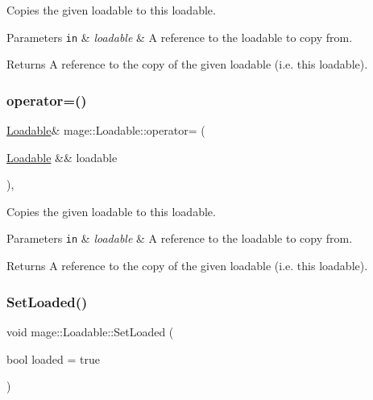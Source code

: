 Copies the given loadable to this loadable.


\begin{DoxyParams}[1]{Parameters}
\mbox{\tt in}  & {\em loadable} & A reference to the loadable to copy from. \\
\hline
\end{DoxyParams}
\begin{DoxyReturn}{Returns}
A reference to the copy of the given loadable (i.\+e. this loadable). 
\end{DoxyReturn}
\hypertarget{classmage_1_1_loadable_adf203e75fa34f78e617fae0682be3444}{}\label{classmage_1_1_loadable_adf203e75fa34f78e617fae0682be3444} 
\subsubsection{\texorpdfstring{operator=()}{operator=()}\hspace{0.1cm}{\footnotesize\ttfamily [2/2]}}
{\footnotesize\ttfamily \hyperlink{classmage_1_1_loadable}{Loadable}\& mage\+::\+Loadable\+::operator= (\begin{DoxyParamCaption}\item[{\hyperlink{classmage_1_1_loadable}{Loadable} \&\&}]{loadable }\end{DoxyParamCaption})\hspace{0.3cm}{\ttfamily [protected]}, {\ttfamily [default]}}

Copies the given loadable to this loadable.


\begin{DoxyParams}[1]{Parameters}
\mbox{\tt in}  & {\em loadable} & A reference to the loadable to copy from. \\
\hline
\end{DoxyParams}
\begin{DoxyReturn}{Returns}
A reference to the copy of the given loadable (i.\+e. this loadable). 
\end{DoxyReturn}
\hypertarget{classmage_1_1_loadable_a932ff8b287c8e68e30a13804cba08ff2}{}\label{classmage_1_1_loadable_a932ff8b287c8e68e30a13804cba08ff2} 
\subsubsection{\texorpdfstring{Set\+Loaded()}{SetLoaded()}}
{\footnotesize\ttfamily void mage\+::\+Loadable\+::\+Set\+Loaded (\begin{DoxyParamCaption}\item[{bool}]{loaded = {\ttfamily true} }\end{DoxyParamCaption})\hspace{0.3cm}{\ttfamily [protected]}}


